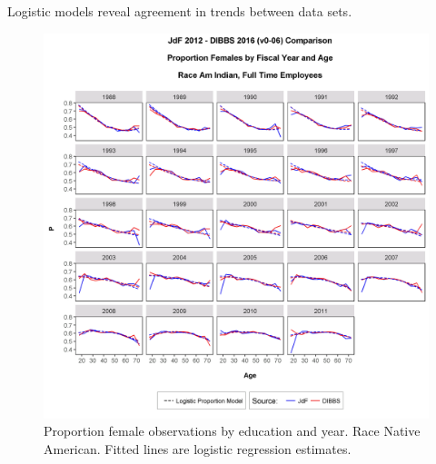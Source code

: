 \documentclass[10pt, letterpaper]{article}
\begin{document}
\begin{spacing}{1.0}
Logistic models reveal agreement in trends between data sets.

\vspace{20pt}

\begin{figure}[h]
    \centering
    \includegraphics[width=6.5in, trim={0 0 0 1in}, clip]{GenderProportionLogisticModelFYRaceAgeAv0-06.png}
    \caption{Proportion female observations by education and year.  Race Native American.  Fitted lines are logistic regression estimates.}
    \label{figure:GenderProportionLogisticModelFYRaceAgeA}
\end{figure}

\clearpage


\end{spacing}
\end{document}
